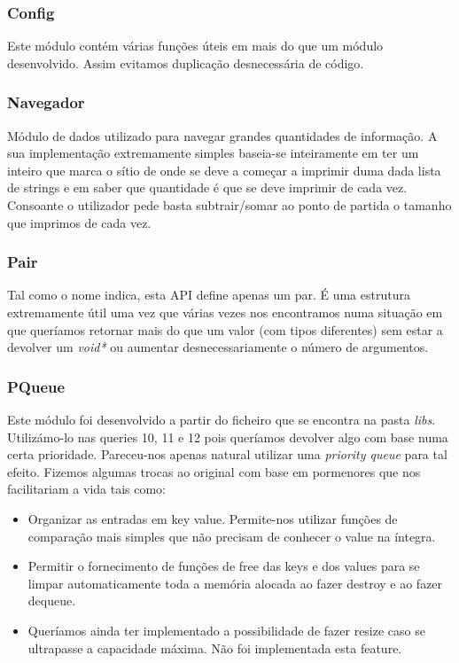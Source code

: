 \documentclass[11pt]{article}
\begin{document}
\subsubsection{Config}
Este módulo contém várias funções úteis em mais do que um módulo desenvolvido. Assim evitamos duplicação desnecessária de código.

\subsubsection{Navegador}
Módulo de dados utilizado para navegar grandes quantidades de informação. A sua implementação extremamente simples baseia-se inteiramente em ter um inteiro que marca o sítio de onde se deve a começar a imprimir duma dada lista de strings e em saber que quantidade é que se deve imprimir de cada vez. Consoante o utilizador pede basta subtrair/somar ao ponto de partida o tamanho que imprimos de cada vez.

\subsubsection{Pair}
Tal como o nome indica, esta API define apenas um par. É uma estrutura extremamente útil uma vez que várias vezes nos encontramos numa situação em que queríamos retornar mais do que um valor (com tipos diferentes) sem estar a devolver um \textit{void*} ou aumentar desnecessariamente o número de argumentos.

\subsubsection{PQueue}
Este módulo foi desenvolvido a partir do ficheiro que se encontra na pasta \textit{libs}. Utilizámo-lo nas queries 10, 11 e 12 pois queríamos devolver algo com base numa certa prioridade. Pareceu-nos apenas natural utilizar uma \textit{priority queue} para tal efeito. Fizemos algumas trocas ao original com base em pormenores que nos facilitariam a vida tais como:
\begin{itemize}
    \item Organizar as entradas em key value. Permite-nos utilizar funções de comparação mais simples que não precisam de conhecer o value na íntegra.
    \item Permitir o fornecimento de funções de free das keys e dos values para se limpar automaticamente toda a memória alocada ao fazer destroy e ao fazer dequeue.
    \item Queríamos ainda ter implementado a possibilidade de fazer resize caso se ultrapasse a capacidade máxima. Não foi implementada esta feature.
\end{itemize}
\end{document}
